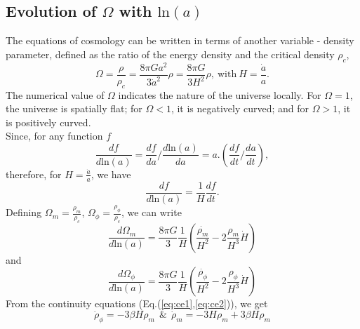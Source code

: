 \documentclass[preprint,aps,floatfix]{revtex4}
\def\nn{\nonumber}
\begin{document}

\subsection{Evolution of $\Omega$ with $\text{ln}(a)$}
\label{sec:omega}
\noindent
        The equations of cosmology can be written in terms of another variable - density parameter, defined as the ratio of the energy density and the critical density $\rho_c$,
        \begin{equation}
            \Omega = \frac{\rho}{\rho_c} = \frac{8\pi G a^2}{3\dot{a}^2}\rho = \frac{8\pi G}{3H^2}\rho,~\text{with}~H = \frac{\dot{a}}{a}.
        \end{equation}
        The numerical value of $\Omega$ indicates the nature of the universe locally.
        For $\Omega = 1$, the universe is spatially flat; for $\Omega<1$, it is negatively curved; and for $\Omega >1$, it is positively curved.\\
        Since, for any function $f$
        \begin{equation}
            \frac{df}{d\text{ln}(a)} = \frac{df}{da}/\frac{d\text{ln}(a)}{da} = a.(\frac{df}{dt}/\frac{da}{dt}),\nn
        \end{equation}
        therefore, for $H = \displaystyle\frac{\dot{a}}{a}$, we have
        \begin{equation}
            \frac{df}{d\text{ln}(a)} = \frac{1}{H} \frac{df}{dt}.
        \end{equation}
        Defining $\Omega_m = \displaystyle\frac{\rho_m}{\rho_c}$, $\Omega_\phi= \displaystyle\frac{\rho_\phi}{\rho_c}$, we can write
        \begin{equation}\label{eq:DensityParameterDE1}
            \frac{d\Omega_m}{d\text{ln}(a)} = \frac{8\pi G}{3}\frac{1}{H}\left( \frac{\dot{\rho_m}}{H^2} -2\frac{\rho_m}{H^3}\dot{H}\right)
        \end{equation}
        and
        \begin{equation}\label{eq:DensityParameterDE2}
            \frac{d\Omega_\phi}{d\text{ln}(a)} = \frac{8\pi G}{3}\frac{1}{H}\left( \frac{\dot{\rho_\phi}}{H^2} -2\frac{\rho_\phi}{H^3}\dot{H}\right)
        \end{equation}
        From the continuity equations (Eq.(\ref{eq:ce1},\ref{eq:ce2})), we get
        \begin{equation}\label{eq:DensityRate}
            \dot\rho_\phi = -3\beta H \rho_m~~\&~~ \dot\rho_m = -3H\rho_m + 3\beta H \rho_m 
        \end{equation} 
\end{document}
